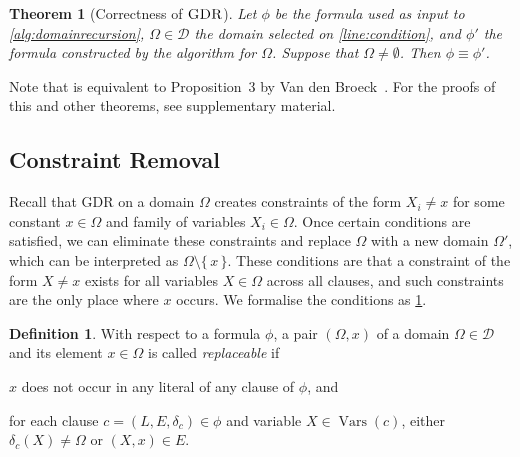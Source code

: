 \documentclass{article}
\newtheorem{theorem}{Theorem}
\theoremstyle{definition}
\newtheorem{definition}{Definition}
\theoremstyle{remark}
\DeclareMathOperator{\GDR}{\textsc{GDR}}
\DeclareMathOperator{\Vars}{Vars}
\begin{document}
\begin{theorem}[Correctness of $\GDR$]\label{thm:correctness1}
  Let $\phi$ be the formula used as input to \cref{alg:domainrecursion},
  $\Omega \in \mathcal{D}$ the domain selected on \cref{line:condition}, and
  $\phi'$ the formula constructed by the algorithm for $\Omega$. Suppose that
  $\Omega \ne \emptyset$. Then $\phi \equiv \phi'$.
\end{theorem}

Note that  is equivalent to Proposition~3 by Van den
Broeck~. For the proofs of this and other
theorems, see supplementary material.

\subsection{Constraint Removal}\label{sec:cr}

Recall that GDR on a domain $\Omega$ creates constraints of the form $X_i \ne x$
for some constant $x \in \Omega$ and family of variables $X_i \in \Omega$. Once
certain conditions are satisfied, we can eliminate these constraints and replace
$\Omega$ with a new domain $\Omega'$, which can be interpreted as
$\Omega \setminus \{\, x \,\}$. These conditions are that a constraint of the
form $X \ne x$ exists for all variables $X \in \Omega$ across all clauses, and
such constraints are the only place where $x$ occurs. We formalise the
conditions as \cref{def:replaceable}.

\begin{definition}\label{def:replaceable}
  With respect to a formula $\phi$, a pair $(\Omega, x)$ of a domain
  $\Omega \in \mathcal{D}$ and its element $x \in \Omega$ is called
  \emph{replaceable} if
  \begin{enumerate*}[label=(\roman*)]
    \item $x$ does not occur in any literal of any clause of $\phi$, and
    \item for each clause $c = (L, E, \delta_c) \in \phi$ and variable
    $X \in \Vars(c)$, either $\delta_c(X) \ne \Omega$ or $(X, x) \in E$.
  \end{enumerate*}
\end{definition}
\end{document}
